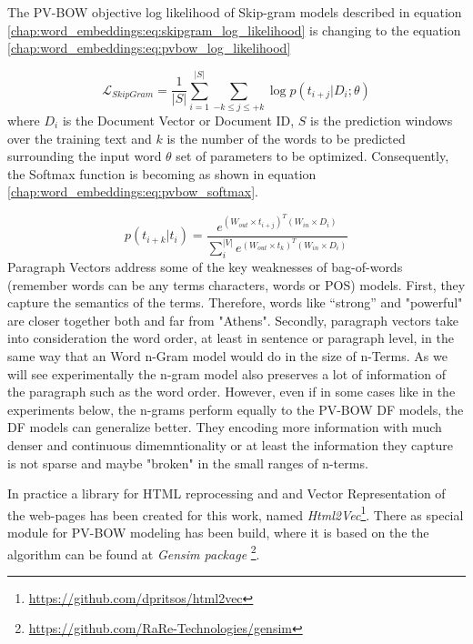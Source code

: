 The PV-BOW objective log likelihood of Skip-gram models described in equation \ref{chap:word_embeddings:eq:skipgram_log_likelihood} is changing to the equation \ref{chap:word_embeddings:eq:pvbow_log_likelihood}  

\begin{equation} \label{chap:word_embeddings:eq:pvbow_log_likelihood}
	 \mathcal{L}_{SkipGram} = \frac{1}{|S|} \sum_{i=1}^{|S|}{ \sum_{-k \leq j \leq +k}{ \log {p(t_{i+j}|D_{i};\theta)}  } }
\end{equation}
\noindent
where $D_{i}$ is the Document Vector or Document ID, $S$ is the prediction windows over the training text and $k$ is the number of the words to be predicted surrounding the input word $\theta$ set of parameters to be optimized. Consequently,  the Softmax function is becoming as shown in equation \ref{chap:word_embeddings:eq:pvbow_softmax}.

\begin{equation} \label{chap:word_embeddings:eq:pvbow_softmax}
	p(t_{i+k}|t_{i}) = \frac{ e^{(W_{out}  \times  t_{i+j})^{T} (W_{in} \times  D_{i})}}{\sum^{|V|}_{i}{ e^{(W_{out}  \times  t_{k})^{T} (W_{in} \times  D_{i})}}} 
\end{equation}
Paragraph Vectors address some of the key weaknesses of bag-of-words (remember words can be any terms characters, words or POS) models. First, they capture the semantics of the terms. Therefore, words like “strong”  and "powerful" are closer together both and far from "Athens". Secondly, paragraph vectors take into consideration the word order, at least in sentence or paragraph level, in the same way that an Word n-Gram model would do in the size of n-Terms. As we will see experimentally the n-gram model also preserves a lot of information of the paragraph such as the word order. However, even if in some cases like in the experiments below, the n-grams perform equally to the PV-BOW DF models, the DF models can generalize better. They encoding more information with much denser and continuous dimemntionality or at least the information they capture is not sparse and maybe "broken" in the small ranges of n-terms.

In practice a library for HTML reprocessing and and Vector Representation of the web-pages has been created for this work, named  \textit{Html2Vec}\footnote{\url{https://github.com/dpritsos/html2vec}}. There as special module for PV-BOW modeling has been build, where it is based on the the algorithm can be found at \textit{Gensim package} \footnote{\url{https://github.com/RaRe-Technologies/gensim}}. 


